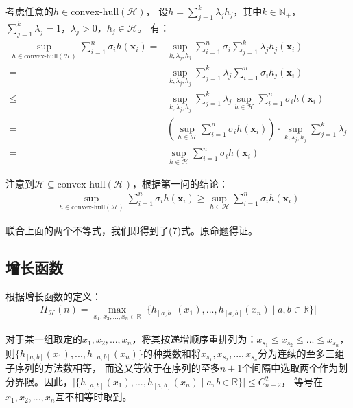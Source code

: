 \documentclass[12pt, a4paper]{article}
\newcommand{\under}[1]{\mathop{#1}\limits_}
\newcommand{\HH}{{\mathcal{H}}}
\begin{document}
\begin{enumerate}
        考虑任意的$h \in \text{convex-hull}(\HH)$，
        设$h = \sum_{j = 1}^{k} \lambda_j h_j$，其中$k \in \mathbb{N}_+$，$\sum_{j = 1}^{k} \lambda_j = 1$，$\lambda_j > 0$，$h_j \in \HH$。
        有：
        \begin{align*}
        \sup_{h \in \text{convex-hull}(\HH)} \sum_{i = 1}^{n} \sigma_i h(\bm{x}_i)
        =& \sup_{k, \lambda_j, h_j} \sum_{i = 1}^{n} \sigma_i \sum_{j = 1}^{k} \lambda_j h_j(\bm{x}_i) \\
        =& \sup_{k, \lambda_j, h_j} \sum_{j = 1}^{k} \lambda_j \sum_{i = 1}^{n} \sigma_i h_j(\bm{x}_i) \\
        \le& \sup_{k, \lambda_j, h_j} \sum_{j = 1}^{k} \lambda_j \sup_{h \in \HH} \sum_{i = 1}^{n} \sigma_i h(\bm{x}_i) \\
        =& (\sup_{h \in \HH} \sum_{i = 1}^{n} \sigma_i h(\bm{x}_i)) \cdot \sup_{k, \lambda_j, h_j} \sum_{j = 1}^{k} \lambda_j \\
        =& \sup_{h \in \HH} \sum_{i = 1}^{n} \sigma_i h(\bm{x}_i)
        \end{align*}

        注意到$\HH \subseteq \text{convex-hull}(\HH)$，根据第一问的结论：
        \begin{align*}
        \sup_{h \in \text{convex-hull}(\HH)} \sum_{i = 1}^{n} \sigma_i h(\bm{x}_i) \ge \sup_{h \in \HH} \sum_{i = 1}^{n} \sigma_i h(\bm{x}_i)
        \end{align*}

        联合上面的两个不等式，我们即得到了(7)式。原命题得证。

    \end{enumerate}

    \subsection{增长函数}

        根据增长函数的定义：
        \begin{align*}
        \Pi_\HH(n) = \under{\max}{x_1, x_2, ..., x_n \in \mathbb{R}} \vert \{h_{[a, b]}(x_1), ..., h_{[a, b]}(x_n) \mid a, b \in \mathbb{R}\} \vert
        \end{align*}

        对于某一组取定的$x_1, x_2, ..., x_n$，将其按递增顺序重排列为：$x_{s_1} \le x_{s_2} \le ... \le x_{s_n}$，
        则$\{h_{[a, b]}(x_1), ..., h_{[a, b]}(x_n)\}$的种类数和将$x_{s_1}, x_{s_2}, ..., x_{s_n}$分为连续的至多三组子序列的方法数相等，
        而这又等效于在序列的至多$n + 1$个间隔中选取两个作为划分界限。因此，$\vert \{h_{[a, b]}(x_1), ..., h_{[a, b]}(x_n) \mid a, b \in \mathbb{R}\} \vert \le C_{n + 2}^2$，
        等号在$x_1, x_2, ..., x_n$互不相等时取到。
\end{document}
